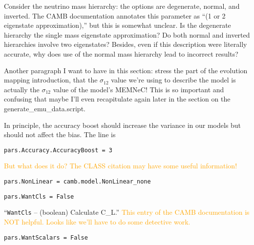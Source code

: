 Consider the neutrino mass 
hierarchy: the options are degenerate, normal, and inverted. The CAMB 
documentation annotates this parameter as ``(1 or 2 eigenstate 
approximation),'' but this is somewhat unclear. Is the degenerate hierarchy 
the single mass eigenstate approximation? Do both normal and inverted 
hierarchies involve two eigenstates? Besides, even if this description were
literally accurate, why does use of the normal mass hierarchy lead to
incorrect results?



Another paragraph I want to have in this section: stress the part of the evolution mapping introduction, that the $\sigma_{12}$ value we're using to describe the model is actually the $\sigma_{12}$ value of the model's MEMNeC! This is so important and confusing that maybe I'll even recapitulate again later in the section on the generate\_emu\_data.script.


In principle, the accuracy boost should increase the variance in our models but should not affect the bias. The line is

\verb|pars.Accuracy.AccuracyBoost = 3|

\textcolor{orange}{But what does it do? The CLASS citation may have some
useful information!}

\verb|pars.NonLinear = camb.model.NonLinear_none|


\verb|pars.WantCls = False|

``\verb|WantCls| – (boolean) Calculate C\_L.'' \textcolor{orange}{This entry 
of
the CAMB documentation is NOT helpful. Looks like we’ll have to do some
detective work.}

\verb|pars.WantScalars = False|

